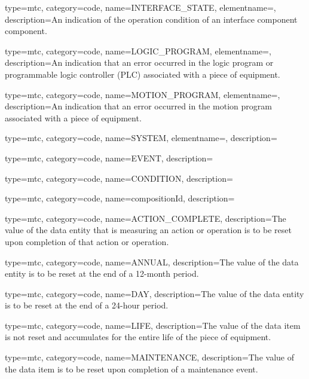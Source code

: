 {
  type=mtc,
  category=code,
  name={INTERFACE\_STATE},
  elementname=,
  description={An indication of the operation condition of an \gls{interface component} component.}
}

{
  type=mtc,
  category=code,
  name={LOGIC\_PROGRAM},
  elementname=,
  description={An indication that an error occurred in the logic program or programmable logic controller (PLC) associated with a piece of equipment.}
}

{
  type=mtc,
  category=code,
  name={MOTION\_PROGRAM},
  elementname=,
  description={An indication that an error occurred in the motion program associated with a piece of equipment.}
}

{
  type=mtc,
  category=code,
  name={SYSTEM},
  elementname=,
  description={}
}

{
  type=mtc,
  category=code,
  name={EVENT},
  description={}
}

{
  type=mtc,
  category=code,
  name={CONDITION},
  description={}
}

{
type=mtc,
category=code,
name={compositionId},
description={}
}

{
  type=mtc,
  category=code,
  name={ACTION\_COMPLETE},
  description={The value of the \gls{data entity} that is measuring an action or operation is to be reset upon completion of that action or operation.}
}

{
  type=mtc,
  category=code,
  name={ANNUAL},
  description={The value of the \gls{data entity} is to be reset at the end of a 12-month period.}
}

{
  type=mtc,
  category=code,
  name={DAY},
  description={The value of the \gls{data entity} is to be reset at the end of a 24-hour period.}
}

{
  type=mtc,
  category=code,
  name={LIFE},
  description={The value of the data item is not reset and accumulates for the entire life of the piece of equipment.}
}

{
  type=mtc,
  category=code,
  name={MAINTENANCE},
  description={The value of the data item is to be reset upon completion of a maintenance event.}
}

